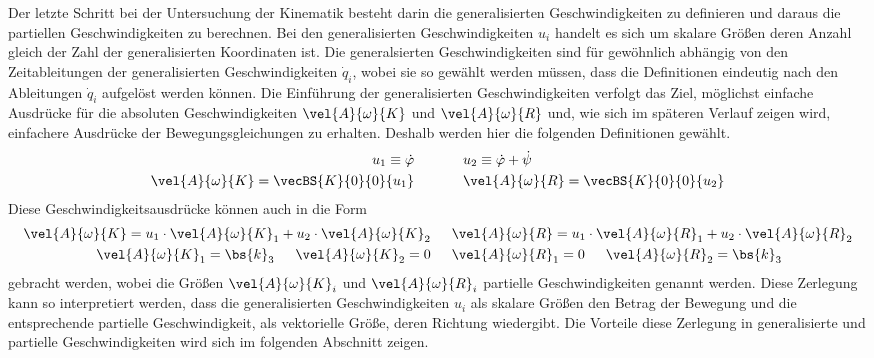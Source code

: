 Der letzte Schritt bei der Untersuchung der Kinematik besteht darin die  generalisierten Geschwindigkeiten zu definieren und daraus die partiellen Geschwindigkeiten zu berechnen. Bei den generalisierten Geschwindigkeiten $u_i$ handelt es sich um skalare Größen deren Anzahl gleich der Zahl der generalisierten Koordinaten ist. Die generalsierten Geschwindigkeiten sind für gewöhnlich abhängig von den Zeitableitungen der generalisierten Geschwindigkeiten $\dot{q}_i$, wobei sie so gewählt werden müssen, dass die Definitionen eindeutig nach den Ableitungen $\dot{q}_i$ aufgelöst werden können. Die Einführung der generalisierten Geschwindigkeiten verfolgt das Ziel, möglichst einfache Ausdrücke für die absoluten Geschwindigkeiten $\vel{A}{\omega}{K}$ und $\vel{A}{\omega}{R}$ und, wie sich im späteren Verlauf zeigen wird, einfachere Ausdrücke der Bewegungsgleichungen zu erhalten. Deshalb werden hier die folgenden Definitionen gewählt.
\begin{equation}
\begin{split}
u_1 \equiv \dot{\varphi} &\hspace{35pt} u_2 \equiv \dot{\varphi} + \dot{\psi} \\
\vel{A}{\omega}{K} = \vecBS{K}{0}{0}{u_1} & \hspace{35pt} \vel{A}{\omega}{R}=\vecBS{K}{0}{0}{u_2}
\end{split}
\end{equation}
Diese Geschwindigkeitsausdrücke können auch in die Form
\begin{equation}
\begin{split}
\vel{A}{\omega}{K} = u_1 \cdot \vel{A}{\omega}{K}_1 + u_2 \cdot \vel{A}{\omega}{K}_2 &\hspace{15pt} \vel{A}{\omega}{R} = u_1 \cdot \vel{A}{\omega}{R}_1 + u_2 \cdot \vel{A}{\omega}{R}_2
\\
\vel{A}{\omega}{K}_1 = \bs{k}_3 \hspace{15pt} \vel{A}{\omega}{K}_2 = 0 &\hspace{15pt}\vel{A}{\omega}{R}_1 = 0 \hspace{15pt} \vel{A}{\omega}{R}_2 = \bs{k}_3
\end{split}
\end{equation}
gebracht werden, wobei die Größen $\vel{A}{\omega}{K}_i$ und $\vel{A}{\omega}{R}_i$ partielle Geschwindigkeiten genannt werden. Diese Zerlegung kann so interpretiert werden, dass die generalisierten Geschwindigkeiten $u_i$ als skalare Größen den Betrag der Bewegung und die entsprechende partielle Geschwindigkeit, als vektorielle Größe, deren Richtung wiedergibt. Die Vorteile diese Zerlegung in generalisierte und partielle Geschwindigkeiten wird sich im folgenden Abschnitt zeigen.
